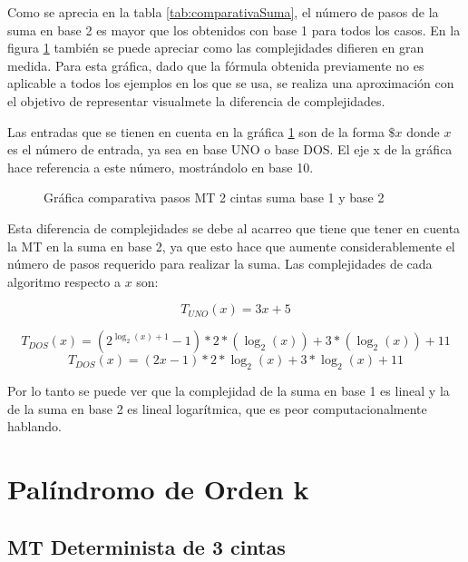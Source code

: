 \documentclass{uc3mpracticas}
\begin{document}
  Como se aprecia en la tabla \ref{tab:comparativaSuma}, el número de pasos de la suma en base 2 es mayor que los obtenidos con base 1 para todos los casos. En la figura \ref{fig:comparativaEJ1y2} también se puede apreciar como las complejidades difieren en gran medida. Para esta gráfica, dado que la fórmula obtenida previamente no es aplicable a todos los ejemplos en los que se usa, se realiza una aproximación con el objetivo de representar visualmete la diferencia de complejidades.

  \vspace{2mm}

  Las entradas que se tienen en cuenta en la gráfica \ref{fig:comparativaEJ1y2} son de la forma $\$x$ donde $x$ es el número de entrada, ya sea en base UNO o base DOS. El eje x de la gráfica hace referencia a este número, mostrándolo en base 10.



  \begin{figure}[!h]
    \caption{Gráfica comparativa pasos MT 2 cintas suma base 1 y base 2}
    \label{fig:comparativaEJ1y2}
  \end{figure}


  Esta diferencia de complejidades se debe al acarreo que tiene que tener en cuenta la MT en la suma en base 2, ya que esto hace que aumente considerablemente el número de pasos requerido para realizar la suma. Las complejidades de cada algoritmo respecto a $x$ son:

  $$ T_{UNO}(x) = 3x + 5 $$

  $$ T_{DOS}(x) = (2^{\log_2(x)+1} - 1) * 2*(\log_2(x))+ 3*(\log_2(x)) + 11  $$
  $$ T_{DOS}(x) = (2x - 1) * 2*\log_2(x) + 3*\log_2(x) + 11  $$


  Por lo tanto se puede ver que la complejidad de la suma en base 1 es lineal y la de la suma en base 2 es lineal logarítmica, que es peor computacionalmente hablando.



  \clearpage


  \section{Palíndromo de Orden k}

  \subsection{MT Determinista de 3 cintas}
\end{document}
